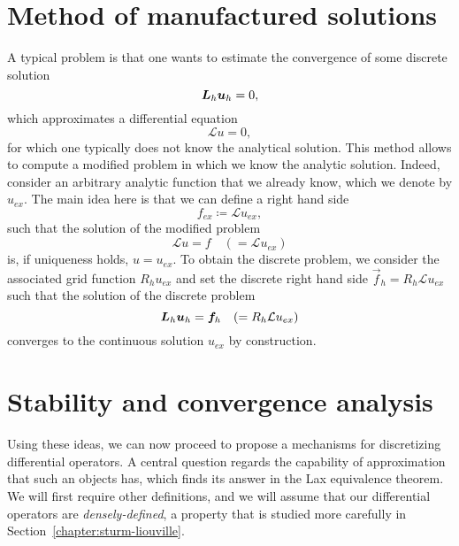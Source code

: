 \section{Method of manufactured solutions}\label{sec:manufactured-solutions}
A typical problem is that one wants to estimate the convergence of some discrete solution
    \begin{equation}
\mat L_h \vec u_h = 0,
\end{equation}
which approximates a differential equation
    \begin{equation}
\mathcal L u = 0,
\end{equation}
for which one typically does not know the analytical solution. This method allows to compute a modified problem in which we know the analytic solution. Indeed, consider an arbitrary analytic function that we already know, which we denote by $u_{ex}$. The main idea here is that we can define a right hand side 
    \begin{equation}
f_{ex} \coloneqq \mathcal L u_{ex},
\end{equation}
such that the solution of the modified problem 
    \begin{equation}
\mathcal L u = f \quad ( = \mathcal L u_{ex})
\end{equation}
    is, if uniqueness holds, $u = u_{ex}$. To obtain the discrete problem, we consider the associated grid function $R_h u_{ex}$ and set the discrete right hand side $\vec f_h = R_h \mathcal L u_{ex}$ such that the solution of the discrete problem 
    \begin{equation}
\mat L_h \vec u_h = \vec f_h \quad (=R_h \mathcal L u_{ex})
\end{equation}
converges to the continuous solution $u_{ex}$ by construction. 

\section{Stability and convergence analysis}\label{sec:fd-convergence-analysiss}
Using these ideas, we can now proceed to propose a mechanisms for discretizing differential operators. A central question regards the capability of approximation that such an objects has, which finds its answer in the Lax equivalence theorem. We will first require other definitions, and we will assume that our differential operators are \emph{densely-defined}, a property that is studied more carefully in Section~\ref{chapter:sturm-liouville}.

